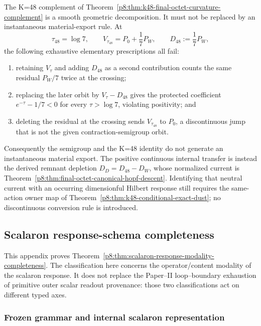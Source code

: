 \documentclass[12pt,a4paper]{article}
\begin{document}
The K=48 complement of
Theorem~\ref{p8:thm:k48-final-octet-curvature-complement} is a smooth
geometric decomposition.  It must not be replaced by an instantaneous
material-export rule.  At
\begin{equation}
 \tau_{48}=\log7,
 \qquad
 V_{\tau_{48}}=P_0+\frac17P_W,
 \qquad
 D_{48}:=\frac17P_W,
\end{equation}
the following exhaustive elementary prescriptions all fail:
\begin{enumerate}
\item retaining $V_\tau$ and adding $D_{48}$ as a second contribution counts
the same residual $P_W/7$ twice at the crossing;
\item replacing the later orbit by $V_\tau-D_{48}$ gives the protected
coefficient $e^{-\tau}-1/7<0$ for every $\tau>\log7$, violating positivity;
and
\item deleting the residual at the crossing sends
$V_{\tau_{48}}$ to $P_0$, a discontinuous jump that is not the given
contraction-semigroup orbit.
\end{enumerate}
Consequently the semigroup and the K=48 identity do not generate an
instantaneous material export.  The positive continuous internal transfer is
instead the derived remnant depletion
\(D_D=D_{48}-D_W\), whose normalized current is
Theorem~\ref{p8:thm:final-octet-canonical-hopf-descent}.  Identifying that
neutral current with an occurring dimensionful Hilbert response still
requires the same-action owner map of
Theorem~\ref{p8:thm:k48-conditional-exact-dust}; no discontinuous conversion
rule is introduced.

\subsection{Scalaron response-schema completeness}
\label{p8:app:scalaron-response-completeness}

This appendix proves
Theorem~\ref{p8:thm:scalaron-response-modality-completeness}.  The classification
here concerns the operator/content modality of the scalaron response.  It does
not replace the Paper--II loop--boundary exhaustion of primitive outer scalar
readout provenance: those two classifications act on different typed axes.

\subsubsection{Frozen grammar and internal scalaron representation}
\end{document}
